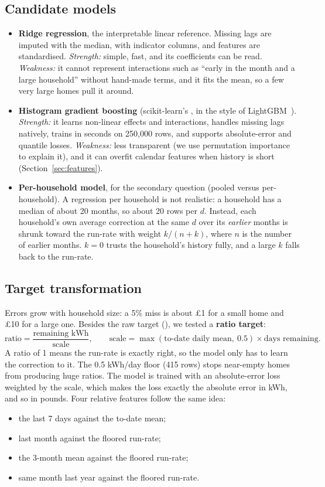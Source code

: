 \documentclass[11pt,letterpaper]{article}
\begin{document}
\subsection{Candidate models}
\begin{itemize}
  \item \textbf{Ridge regression}, the interpretable linear reference. Missing lags are imputed with the median,
  with indicator columns, and features are standardised. \emph{Strength:} simple, fast, and its coefficients can
  be read. \emph{Weakness:} it cannot represent interactions such as ``early in the month and a large household''
  without hand-made terms, and it fits the mean, so a few very large homes pull it around.
  \item \textbf{Histogram gradient boosting} (scikit-learn's , in the style of
  LightGBM~\cite{ke2017lightgbm}). \emph{Strength:} it learns non-linear effects and interactions, handles missing
  lags natively, trains in seconds on 250,000 rows, and supports absolute-error and quantile losses.
  \emph{Weakness:} less transparent (we use permutation importance to explain it), and it can overfit calendar
  features when history is short (Section~\ref{sec:features}).
  \item \textbf{Per-household model}, for the secondary question (pooled versus per-household). A regression per
  household is not realistic: a household has a median of about 20 months, so about 20 rows per $d$. Instead, each
  household's own average correction at the same $d$ over its \emph{earlier} months is shrunk toward the run-rate
  with weight $k/(n+k)$, where $n$ is the number of earlier months. $k = 0$ trusts the household's history fully,
  and a large $k$ falls back to the run-rate.
\end{itemize}

\subsection{Target transformation}
\label{sec:target}
Errors grow with household size: a 5\% miss is about \pounds 1 for a small home and \pounds 10 for a large one.
Besides the raw target (), we tested a \textbf{ratio target}:
\[
  \text{ratio} = \frac{\text{remaining kWh}}{\text{scale}}, \qquad
  \text{scale} = \max(\text{to-date daily mean},\ 0.5) \times \text{days remaining}.
\]
A ratio of 1 means the run-rate is exactly right, so the model only has to learn the correction to it. The 0.5
kWh/day floor (415 rows) stops near-empty homes from producing huge ratios. The model is trained with an
absolute-error loss weighted by the scale, which makes the loss exactly the absolute error in kWh, and so in
pounds. Four relative features follow the same idea:
\begin{itemize}
  \item the last 7 days against the to-date mean;
  \item last month against the floored run-rate;
  \item the 3-month mean against the floored run-rate;
  \item same month last year against the floored run-rate.
\end{itemize}
\end{document}
